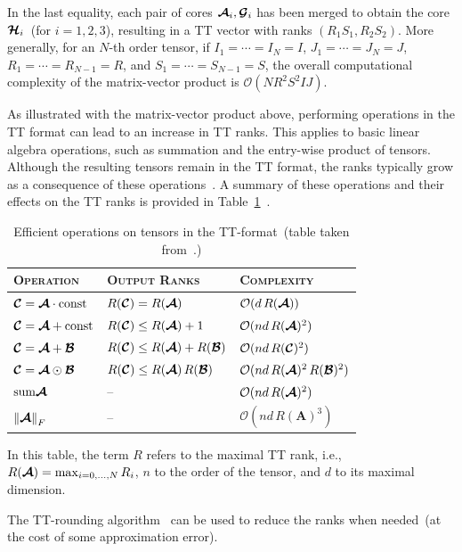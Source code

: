In the last equality, each pair of cores $\bm{\mathcal{A}}_i,\bm{\mathcal{G}}_i$ has been merged to obtain the core $\bm{\mathcal{H}}_i$~(for $i = 1,2,3$), resulting in a  TT vector with ranks $(R_1 S_1, R_2 S_2)$. More generally, for an $N$-th order tensor, if $I_1 = \cdots = I_N = I$, $J_1 = \cdots = J_N = J$, $R_1 = \cdots = R_{N-1} = R$, and $S_1 = \cdots = S_{N-1} = S$, the overall computational complexity of the matrix-vector product is $\mathcal{O}(N R^2 S^2 I J)$.

As illustrated with the matrix-vector product above, performing operations in the TT format can lead to an increase in TT ranks. This applies to basic linear algebra operations, such as summation and the entry-wise product of
tensors. Although the resulting tensors remain in the TT format, the ranks typically grow as a consequence of these operations~\citep{oseledets2010approximation}. A summary of these operations and their effects on the TT ranks is provided in Table~\ref{tab:tt-operations}~\citep{novikov2014putting}. 
\begin{table}
\centering
\begin{tabular}{lll}
\toprule
\textsc{Operation} & \textsc{Output Ranks} & \textsc{Complexity} \\
\midrule
$\bm{\mathcal{C}} = \bm{\mathcal{A}} \cdot \text{const}$ & $R(\bm{\mathcal{C}}) = R(\bm{\mathcal{A}})$ & $\mathcal{O}(d\,R(\bm{\mathcal{A}}))$ \\
$\bm{\mathcal{C}} = \bm{\mathcal{A}} + \text{const}$ & $R(\bm{\mathcal{C}}) \leq R(\bm{\mathcal{A}}) + 1$ & $\mathcal{O}(nd\,R(\bm{\mathcal{A}})^2)$ \\
$\bm{\mathcal{C}} = \bm{\mathcal{A}} + \bm{\mathcal{B}}$ & $R(\bm{\mathcal{C}}) \leq R(\bm{\mathcal{A}}) + R(\bm{\mathcal{B}})$ & $\mathcal{O}(nd\,R(\bm{\mathcal{C}})^2)$ \\
$\bm{\mathcal{C}} = \bm{\mathcal{A}} \odot \bm{\mathcal{B}}$ & $R(\bm{\mathcal{C}}) \leq R(\bm{\mathcal{A}})\,R(\bm{\mathcal{B}})$ & $\mathcal{O}(nd\,R(\bm{\mathcal{A}})^2\,R(\bm{\mathcal{B}})^2)$ \\
$\mathrm{sum} \bm{\mathcal{A}}$ & -- & $\mathcal{O}(nd\,R(\bm{\mathcal{A}})^2)$ \\
$\left\lVert\bm{\mathcal{A}}\right\rVert_F$ & -- & $\mathcal{O}(nd\,R(\mathbf{A})^3)$ \\
\bottomrule
\end{tabular}
\caption{ Efficient operations on tensors in the TT-format~(table taken from~\citep{novikov2014putting}.)}
\label{tab:tt-operations}
\end{table}
In this table, the term $R$ refers to the maximal TT rank, i.e., $R(\bm{\mathcal{A}}) = \max_{i=0,\dots,N} R_i$, $n$ to the order of the tensor, and $d$ to its maximal dimension.

The TT-rounding algorithm~\citep{oseledets2010approximation} can be used to reduce the ranks when needed~(at the cost of some approximation error). 

